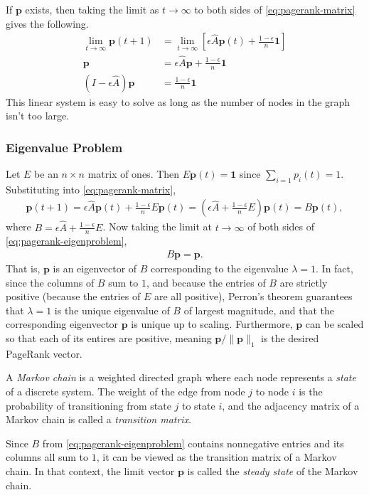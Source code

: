 If $\mathbf{p}$ exists, then taking the limit as $t\rightarrow\infty$ to both sides of \eqref{eq:pagerank-matrix} gives the following.
\begin{align}
\nonumber
\lim_{t\rightarrow\infty}\mathbf{p}(t+1) &= \lim_{t\rightarrow\infty}\left[\epsilon \widehat{A}\mathbf{p}(t) + \frac{1-\epsilon}{n}\mathbf{1}\right] \\
\nonumber
\mathbf{p} &= \epsilon \widehat{A}\mathbf{p} + \frac{1-\epsilon}{n}\mathbf{1} \\
\label{eq:pagerank-algebraic}
\left(I - \epsilon \widehat{A}\right)\mathbf{p} &= \frac{1-\epsilon}{n}\mathbf{1}
\end{align}
This linear system is easy to solve as long as the number of nodes in the graph isn't too large.

\subsubsection*{Eigenvalue Problem} %

Let $E$ be an $n \times n$ matrix of ones.
Then $E\mathbf{p}(t) = \mathbf{1}$ since $\sum_{i=1}p_i(t) = 1$.
Substituting into \eqref{eq:pagerank-matrix},
\begin{align}
\mathbf{p}(t+1)
= \epsilon \widehat{A}\mathbf{p}(t) + \frac{1-\epsilon}{n}E\mathbf{p}(t)
= \left(\epsilon \widehat{A} + \frac{1-\epsilon}{n}E\right)\mathbf{p}(t)
= B\mathbf{p}(t),
\label{eq:pagerank-eigenproblem}
\end{align}
where $B = \epsilon \widehat{A} + \frac{1-\epsilon}{n}E$.
Now taking the limit at $t\rightarrow\infty$ of both sides of \eqref{eq:pagerank-eigenproblem},
\begin{align*}
B\mathbf{p} = \mathbf{p}.
\end{align*}
That is, $\mathbf{p}$ is an eigenvector of $B$ corresponding to the eigenvalue $\lambda = 1$.
In fact, since the columns of $B$ sum to $1$, and because the entries of $B$ are strictly positive (because the entries of $E$ are all positive), Perron's theorem guarantees that $\lambda = 1$ is the unique eigenvalue of $B$ of largest magnitude, and that the corresponding eigenvector $\mathbf{p}$ is unique up to scaling.
Furthermore, $\mathbf{p}$ can be scaled so that each of its entires are positive, meaning $\mathbf{p}/\|\mathbf{p}\|_1$ is the desired PageRank vector.

\begin{info} %
A \emph{Markov chain} is a weighted directed graph where each node represents a \emph{state} of a discrete system.
The weight of the edge from node $j$ to node $i$ is the probability of transitioning from state $j$ to state $i$, and the adjacency matrix of a Markov chain is called a \emph{transition matrix}.

Since $B$ from \eqref{eq:pagerank-eigenproblem} contains nonnegative entries and its columns all sum to $1$, it can be viewed as the transition matrix of a Markov chain.
In that context, the limit vector $\mathbf{p}$ is called the \emph{steady state} of the Markov chain.
\end{info}

